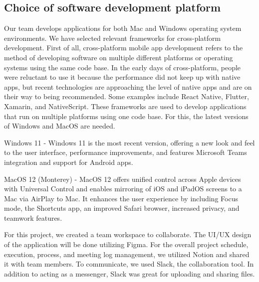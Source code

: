 \documentclass[conference]{IEEEtran}
\begin{document}
\subsection{Choice of software development platform}
Our team develops applications for both Mac and Windows operating system environments. We have selected relevant frameworks for cross-platform development. First of all, cross-platform mobile app development refers to the method of developing software on multiple different platforms or operating systems using the same code base. In the early days of cross-platform, people were reluctant to use it because the performance did not keep up with native apps, but recent technologies are approaching the level of native apps and are on their way to being recommended.  Some examples include React Native, Flutter, Xamarin, and NativeScript. These frameworks are used to develop applications that run on multiple platforms using one code base.  For this, the latest versions of Windows and MacOS are needed.  \par
Windows 11  - Windows 11 is the most recent version, offering a new look and feel to the user interface, performance improvements, and features Microsoft Teams integration and support for Android apps. \par
MacOS 12 (Monterey)  - MacOS 12 offers unified control across Apple devices with Universal Control and enables mirroring of iOS and iPadOS screens to a Mac via AirPlay to Mac. It enhances the user experience by including Focus mode, the Shortcuts app, an improved Safari browser, increased privacy, and teamwork features.

For this project, we created a team workspace to collaborate. The UI/UX design of the application will be done utilizing Figma. For the overall project schedule, execution, process, and meeting log management, we utilized Notion and shared it with team members. To communicate, we used Slack, the collaboration tool. In addition to acting as a messenger, Slack was great for uploading and sharing files.
\end{document}
